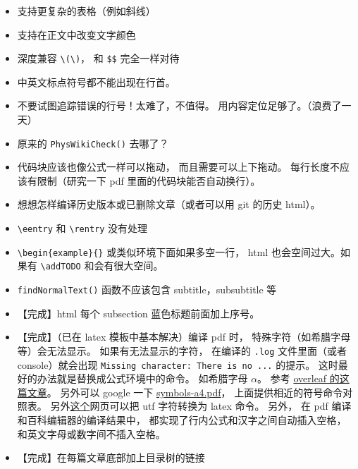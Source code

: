 \begin{itemize}
\item 支持更复杂的表格（例如斜线）

\item 支持在正文中改变文字颜色

\item 深度兼容 \lstinline|\(\)|， 和 \lstinline|$$| 完全一样对待

\item 中英文标点符号都不能出现在行首。

\item 不要试图追踪错误的行号！太难了，不值得。 用内容定位足够了。（浪费了一天）

\item 原来的 \verb`PhysWikiCheck()` 去哪了？

\item 代码块应该也像公式一样可以拖动， 而且需要可以上下拖动。 每行长度不应该有限制（研究一下 pdf 里面的代码块能否自动换行）。

\item 想想怎样编译历史版本或已删除文章（或者可以用 git 的历史 html）。

\item \verb`\eentry` 和 \verb`\rentry` 没有处理

\item \verb`\begin{example}{}` 或类似环境下面如果多空一行， html 也会空间过大。如果有 \verb`\addTODO` 和会有很大空间。

\item \verb`findNormalText()` 函数不应该包含 subtitle，subsubtitle 等

\item 【完成】html 每个 subsection 蓝色标题前面加上序号。

\item 【完成】（已在 latex 模板中基本解决）编译 pdf 时， 特殊字符（如希腊字母等）会无法显示。 如果有无法显示的字符， 在编译的 \verb`.log` 文件里面（或者 console）就会出现 \verb`Missing character: There is no ...` 的提示。 这时最好的办法就是替换成公式环境中的命令。 如希腊字母 $\alpha$。 参考 \href{https://www.overleaf.com/learn/how-to/What_file_encodings_and_line_endings_should_I_use\%3F}{overleaf 的这篇文章}。 另外可以 google 一下 \href{https://tug.ctan.org/info/symbols/comprehensive/symbols-a4.pdf}{symbols-a4.pdf}， 上面提供相近的符号命令对照表。 另外\href{https://www.johndcook.com/unicode_latex.html}{这个}网页可以把 utf 字符转换为 latex 命令。 另外， 在 pdf 编译和百科编辑器的编译结果中， 都实现了行内公式和汉字之间自动插入空格， 和英文字母或数字间不插入空格。

\item 【完成】在每篇文章底部加上目录树的链接
\end{itemize}
